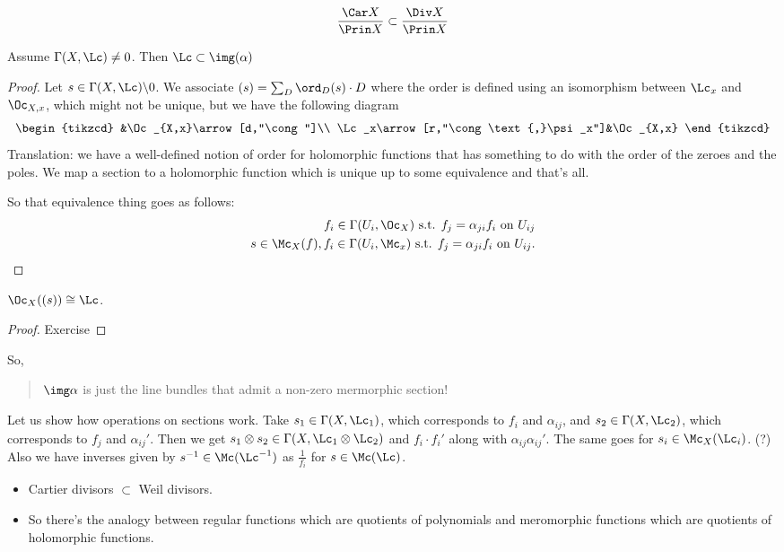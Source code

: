 \[\dfrac{\Car X}{\Prin X}\subset\dfrac{\Div X}{\Prin X}\]
\begin{claim}
	Assume $\Gamma(X,\Lc)\neq0$. Then $\Lc\subset\img(\alpha)$
\end{claim}
\begin{proof}
	Let $s\in\Gamma(X,\Lc)\backslash0$. We associate $(s)=\sum_D\ord_D(s)\cdot D$ where the order is defined using an isomorphism between $\Lc_x$ and $\Oc_{X,x}$, which might not be unique, but we have the following diagram
	\[\begin{tikzcd}
		&\Oc_{X,x}\arrow[d,"\cong"]\\
		\Lc_x\arrow[r,"\cong\text{,}\psi_x"]&\Oc_{X,x}
	\end{tikzcd}\]
	Translation: we have a well-defined notion of order for holomorphic functions that has something to do with the order of the zeroes and the poles. We map a section to a holomorphic function which is unique up to some equivalence and that's all.
	
	So that equivalence thing goes as follows:
	\begin{align*}
		f_i\in\Gamma(U_i,\Oc_X) \text{ s.t. } f_j=\alpha_{ji}f_i\text{ on }U_{ij}\\
		s\in\Mc_X(f),f_i\in\Gamma(U_i,\Mc_x)\text{ s.t. }f_j=\alpha_{ji}f_i\text{ on }U_{ij}.
	\end{align*}
\end{proof}
\begin{claim}
	$\Oc_X((s))\cong\Lc$.
\end{claim}
\begin{proof}
	Exercise
\end{proof}
So,
\begin{quote}
	{\color{red}$\img\alpha$ is just the line bundles that admit a non-zero mermorphic section!}
\end{quote}
Let us show how operations on sections work. Take $s_1\in\Gamma(X,\Lc_1)$, which corresponds to $f_i$ and $\alpha_{ij}$, and $s_2\in\Gamma(X,\Lc_2)$, which corresponds to $f_j$ and $\alpha_{ij}'$. Then we get $s_1\otimes s_2\in\Gamma(X,\Lc_1\otimes\Lc_2)$ and $f_i\cdot f_i'$ along with $\alpha_{ij}\alpha_{ij}'$. {\color{magenta}The same goes for $s_i\in\Mc_X(\Lc_i)$. (?)} Also we have inverses given by $s^{-1}\in\Mc(\Lc^{-1})$ as $\frac{1}{f_i}$ for $s\in\Mc(\Lc)$.
\begin{remark}\leavevmode
	\begin{itemize}
		\item Cartier divisors $\subset$ Weil divisors.
		\item So there's the analogy between regular functions which are quotients of polynomials and meromorphic functions which are quotients of holomorphic functions.
	\end{itemize}
\end{remark}
